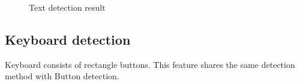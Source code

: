 \begin{figure}[H]
{	    }
	    \qquad
	    \qquad
	    \caption{Text detection result}
		\label{fig:text_detect}
	\end{figure}

\subsection{Keyboard detection}
Keyboard consists of rectangle buttons. This feature shares the same detection method with Button detection.

